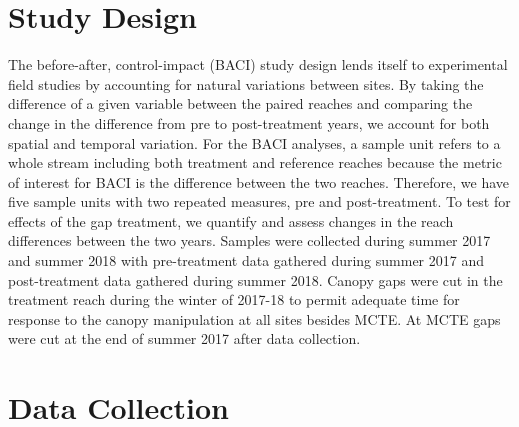 \documentclass[double,12pt]{beavtex}
\begin{document}
  \begin{table}[t]
  
  \caption{\label{tab:table1}Study site attributes}
  \centering
  \end{table}
  
  \section*{Study Design}\label{study-design}
  
  The before-after, control-impact (BACI) study design lends itself to
  experimental field studies by accounting for natural variations between
  sites. By taking the difference of a given variable between the paired
  reaches and comparing the change in the difference from pre to
  post-treatment years, we account for both spatial and temporal
  variation. For the BACI analyses, a sample unit refers to a whole stream
  including both treatment and reference reaches because the metric of
  interest for BACI is the difference between the two reaches. Therefore,
  we have five sample units with two repeated measures, pre and
  post-treatment. To test for effects of the gap treatment, we quantify
  and assess changes in the reach differences between the two years.
  Samples were collected during summer 2017 and summer 2018 with
  pre-treatment data gathered during summer 2017 and post-treatment data
  gathered during summer 2018. Canopy gaps were cut in the treatment reach
  during the winter of 2017-18 to permit adequate time for response to the
  canopy manipulation at all sites besides MCTE. At MCTE gaps were cut at
  the end of summer 2017 after data collection.
  
  \section*{Data Collection}\label{data-collection}
  
\end{document}
